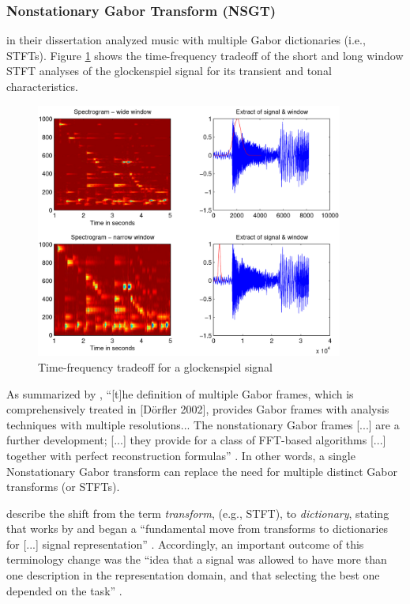 \documentclass[report.tex]{subfiles}
\begin{document}
\newpagefill

\subsubsection{Nonstationary Gabor Transform (NSGT)}
\label{sec:theorynsgt}

\textcite{doerflerphd} in their dissertation analyzed music with multiple Gabor dictionaries (i.e., STFTs). Figure \ref{fig:dorflertradeoff} shows the time-frequency tradeoff of the short and long window STFT analyses of the glockenspiel signal for its transient and tonal characteristics.

\begin{figure}[ht]
	\centering
	\includegraphics[width=0.9\textwidth]{./images-tftheory/tf_tradeoff_dorfler.png}
	\caption{Time-frequency tradeoff for a glockenspiel signal \parencite[20]{doerflerphd}}
	\label{fig:dorflertradeoff}
\end{figure}

As summarized by \citeauthor{adaptivecqt}, ``[t]he definition of multiple Gabor frames, which is comprehensively treated in [D{\"o}rfler 2002], provides Gabor frames with analysis techniques with multiple resolutions... The nonstationary Gabor frames [...] are a further development; [...] they provide for a class of FFT-based algorithms [...] together with perfect reconstruction formulas'' \parencite[2]{adaptivecqt}. In other words, a single Nonstationary Gabor transform can replace the need for multiple distinct Gabor transforms (or STFTs).

\citeauthor{dictionary} describe the shift from the term \textit{transform}, (e.g., STFT), to \textit{dictionary}, stating that works by \cite{dictionary1} and \cite{dictionary2} began a ``fundamental move from transforms to dictionaries for [...] signal representation'' \parencite[1049]{dictionary}. Accordingly, an important outcome of this terminology change was the ``idea that a signal was allowed to have more than one description in the representation domain, and that selecting the best one depended on the task'' \parencite[1049]{dictionary}.
\end{document}
